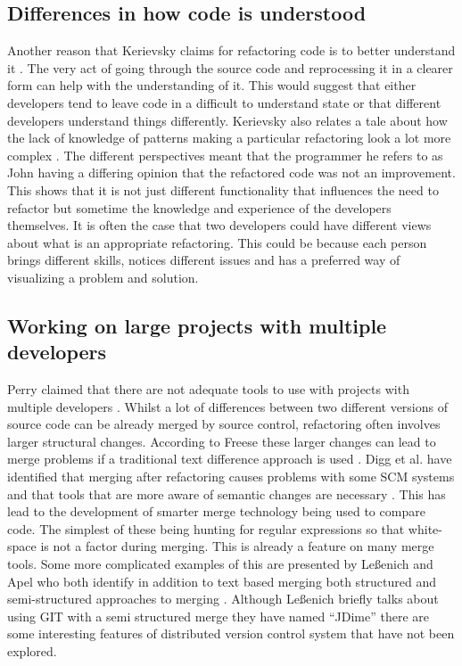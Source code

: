 \documentclass[12pt]{CRPITStyle}
\renewcommand{\cite}{\citep}
\begin{document}
\subsection{Differences in how code is understood}
Another reason that Kerievsky claims for refactoring code is to better understand it \cite{Kerievsky2004}. The very act of going through the source code and reprocessing it in a clearer form can help with the understanding of it. This would suggest that either developers tend to leave code in a difficult to understand state or that different developers understand things differently.
Kerievsky also relates a tale about how the lack of knowledge of patterns making a particular refactoring look a lot more complex \cite{Kerievsky2004}. The different perspectives meant that the programmer he refers to as John having a differing opinion that the refactored code was not an improvement. This shows that it is not just different functionality that influences the need to refactor but sometime the knowledge and experience of the developers themselves. It is often the case that two developers could have different views about what is an appropriate refactoring. This could be because each person brings different skills, notices different issues and has a preferred way of visualizing a problem and solution.

\subsection{Working on large projects with multiple developers}
Perry claimed that there are not adequate tools to use with projects with multiple developers \cite{Perry2001}. Whilst a lot of differences between two different versions of source code can be already merged by source control, refactoring often involves larger structural changes. According to Freese these larger changes can lead to merge problems if a traditional text difference approach is used \cite{freese2007operation}. Digg et al. have identified that merging after refactoring causes problems with some SCM systems and that tools that are more aware of semantic changes are necessary \cite{Dig2008}. This has lead to the development of smarter merge technology being used to compare code. The simplest of these being hunting for regular expressions so that white-space is not a factor during merging. This is already a feature on many merge tools. Some more complicated examples of this are presented by Le{\ss}enich and Apel who both identify in addition to text based merging both structured and semi-structured approaches to merging \cite{LeBenich2012} \cite{Apel2011}. Although Le{\ss}enich briefly talks about using GIT with a semi structured merge they have named ``JDime'' there are some interesting features of distributed version control system that have not been explored.
\end{document}
